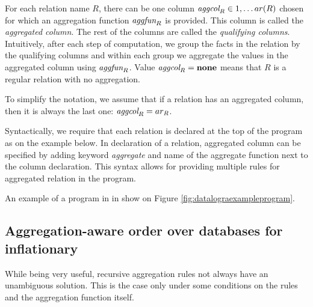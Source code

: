 For each relation name $R$, there can be one column $\textit{aggcol}_R \in {1, \dots ar(R)}$ chosen for which an aggregation function $\textit{aggfun}_R$ is provided. This column is called the \emph{aggregated column}. The rest of the columns are called the \emph{qualifying columns}. Intuitively, after each step of computation, we group the facts in the relation by the qualifying columns and within each group we aggregate the values in the aggregated column using $\textit{aggfun}_R$. Value $\textit{aggcol}_R = \bf{none}$ means that $R$ is a regular relation with no aggregation.

To simplify the notation, we assume that if a relation has an aggregated column, then it is always the last one: $\textit{aggcol}_R = ar_R$.

Syntactically, we require that each \idb relation is declared at the top of the program as on the example below.
In declaration of a relation, aggregated column can be specified by adding keyword \textit{aggregate} and name of the aggregate function next to the column declaration. This syntax allows for providing multiple rules for aggregated relation in the program.

An example of a program in \datalogra in show on Figure \ref{fig:datalograexampleprogram}.

\begin{figure}[h!]
\end{figure}\label{fig:datalograexampleprogram}


\subsection{Aggregation-aware order over databases for inflationary \datalogra}
While being very useful, recursive aggregation rules not always have an unambiguous solution. This is the case only under some conditions on the rules and the aggregation function itself.

